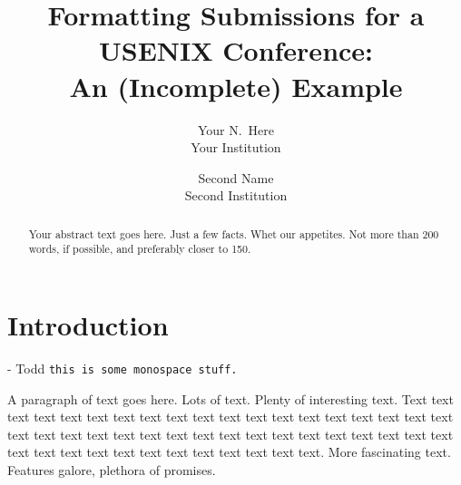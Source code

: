 \usepackage{inconsolata}
\usepackage[outputdir=build]{minted}


\newcommand{\tg}[1]{\ifisdraft{\color{blue}[#1 -- Todd]}\fi}



\date{}

\title{\Large \bf Formatting Submissions for a USENIX Conference:\\
  An (Incomplete) Example}

\author{
{\rm Your N.\ Here}\\
Your Institution
\and
{\rm Second Name}\\
Second Institution
} %

\maketitle

\begin{abstract}
Your abstract text goes here. Just a few facts. Whet our appetites.
Not more than 200 words, if possible, and preferably closer to 150.
\end{abstract}


\section{Introduction}
- Todd
{\tt this is some monospace stuff.}

A paragraph of text goes here. Lots of text. Plenty of interesting
text. Text text text text text text text text text text text text text
text text text text text text text text text text text text text text
text text text text text text text text text text text text text text
text text text text text text text.
More fascinating text. Features galore, plethora of promises.

